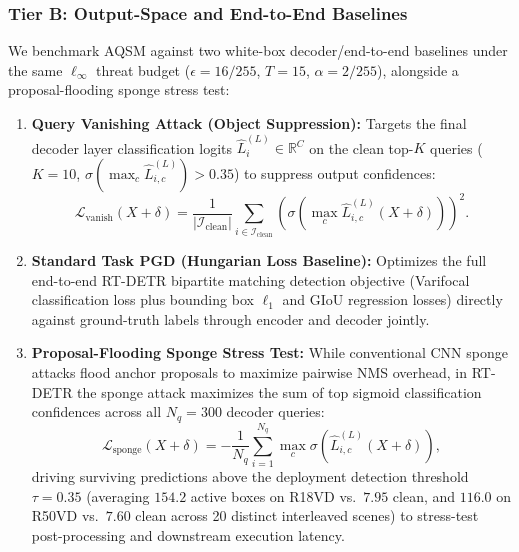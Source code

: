 \documentclass[preprint,10pt]{elsarticle}
\begin{document}
\subsubsection{Tier B: Output-Space and End-to-End Baselines}
We benchmark AQSM against two white-box decoder/end-to-end baselines under the same $\ell_\infty$ threat budget ($\epsilon = 16/255$, $T = 15$, $\alpha = 2/255$), alongside a proposal-flooding sponge stress test:
\begin{enumerate}
    \item \textbf{Query Vanishing Attack (Object Suppression):} Targets the final decoder layer classification logits $\hat{L}_i^{(L)} \in \mathbb{R}^C$ on the clean top-$K$ queries ($K = 10$, $\sigma(\max_c \hat{L}_{i,c}^{(L)}) > 0.35$) to suppress output confidences:
    \begin{equation}
    \mathcal{L}_{\mathrm{vanish}}(X + \delta) = \frac{1}{|\mathcal{I}_{\mathrm{clean}}|} \sum_{i \in \mathcal{I}_{\mathrm{clean}}} \left( \sigma\left(\max_c \hat{L}_{i,c}^{(L)}(X + \delta)\right) \right)^2.
    \label{eq:lvanish}
    \end{equation}
    \item \textbf{Standard Task PGD (Hungarian Loss Baseline):} Optimizes the full end-to-end RT-DETR bipartite matching detection objective (Varifocal classification loss plus bounding box $\ell_1$ and GIoU regression losses) directly against ground-truth labels through encoder and decoder jointly.
    \item \textbf{Proposal-Flooding Sponge Stress Test:} While conventional CNN sponge attacks flood anchor proposals to maximize pairwise NMS overhead, in RT-DETR the sponge attack maximizes the sum of top sigmoid classification confidences across all $N_q = 300$ decoder queries:
    \begin{equation}
    \mathcal{L}_{\mathrm{sponge}}(X + \delta) = - \frac{1}{N_q} \sum_{i=1}^{N_q} \max_c \sigma\left(\hat{L}_{i,c}^{(L)}(X + \delta)\right),
    \label{eq:lsponge}
    \end{equation}
    driving surviving predictions above the deployment detection threshold $\tau = 0.35$ (averaging $154.2$ active boxes on R18VD vs.\ $7.95$ clean, and $116.0$ on R50VD vs.\ $7.60$ clean across 20 distinct interleaved scenes) to stress-test post-processing and downstream execution latency.
\end{enumerate}

\end{document}
